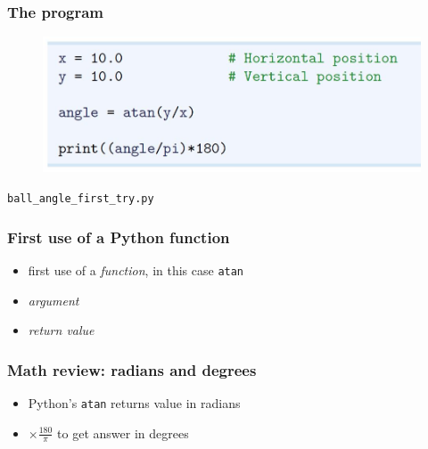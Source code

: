 \documentclass[14pt]{beamer}
\newcommand\red[1]{{\color{red} #1}}
\begin{document}

\begin{frame}[fragile]
\frametitle{The program}

\begin{figure}[ht]
	\centering
	\includegraphics[width=\textwidth]{figures/LLp12}
\end{figure}

\begin{center}
\texttt{ball\_angle\_first\_try.py}
\end{center}

\end{frame}


\begin{frame}[fragile]
\frametitle{First use of a Python function}
\begin{itemize}
\item first use of a \red{\emph{function}}, in this case \texttt{atan}
\item \red{\emph{argument}}
\item \red{\emph{return value}}
\end{itemize}

\end{frame}


\begin{frame}[fragile]
\frametitle{Math review: radians and degrees}
\begin{itemize}
\item Python's \texttt{atan} returns value in radians
\item $\times \frac{180}{\pi}$ to get answer in degrees
\end{itemize}
\end{frame}

\end{document}
